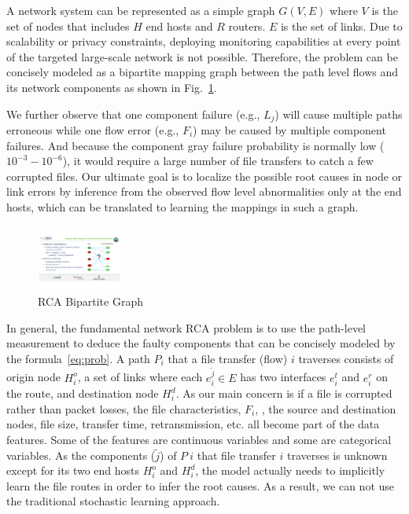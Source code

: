 A network system can be represented as a simple graph $G(V,E)$ where $V$ is the set of nodes that includes $H$ end hosts and $R$ routers. $E$ is the set of links. 
Due to scalability or privacy constraints, deploying monitoring capabilities at every point of the targeted large-scale network is not possible. Therefore, the problem can be concisely modeled as a bipartite mapping graph between the path level flows and its network components as shown in Fig.~\ref{fig:bipartite}. 

We further observe that one component failure (e.g., $L_j$) will cause multiple paths erroneous while one flow error (e.g., $F_i$) may be caused by multiple component failures. And because the component gray failure probability is normally low ($10^{-3} - 10^{-6}$), it would require a large number of file transfers to catch a few corrupted files. Our ultimate goal is to localize the possible root causes in node or link errors by inference from the observed flow level abnormalities only at the end hosts, which can be translated to learning the mappings in such a graph.

\begin{figure}
  \begin{center}
    \includegraphics[width=0.25\textwidth]{./figure/RCABipartite}
  \end{center}
  \vspace{-5pt}
\caption{RCA Bipartite Graph}
\vspace{-5pt}
\label{fig:bipartite}
\end{figure}

In general, the fundamental network RCA problem is to use the path-level measurement to deduce the faulty components that can be concisely modeled by the formula~\ref{eq:prob}.
A path $P_i$ that a file transfer (flow) $i$ traverses consists of origin node $H_i^o$, a set of links where each $e_i^{\tilde{j}}\in E$ has two interfaces $e_i^t$ and $e_i^r$ on the route, and destination node $H_i^d$. 
As our main concern is if a file is corrupted rather than packet losses, the file characteristics, $F_i$, \eg, the source and destination nodes, file size, transfer time, retransmission, etc. all become part of the data features. 
Some of the features are continuous variables and some are categorical variables.
As the components ($\tilde{j}$) of $P\ i$ that file transfer $i$ traverses is unknown except for its two end hosts $H_i^o$ and $H_i^d$, the model actually needs to implicitly learn the file routes in order to infer the root causes.   
As a result, we can not use the traditional stochastic learning approach.

